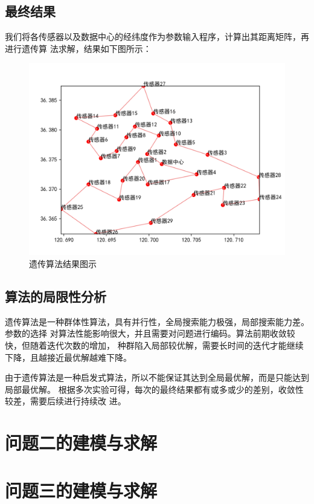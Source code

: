 \documentclass{ctexart}
\begin{document}
    \subsection{最终结果}
    我们将各传感器以及数据中心的经纬度作为参数输入程序，计算出其距离矩阵，再进行遗传算
    法求解，结果如下图所示：
    \begin{figure}[H]
        \centering
        \includegraphics[width=1\textwidth]{figure/path.png}
        \caption {遗传算法结果图示}
    \end{figure}

    \subsection{算法的局限性分析}
    遗传算法是一种群体性算法，具有并行性，全局搜索能力极强，局部搜索能力差。参数的选择
    对算法性能影响很大，并且需要对问题进行编码。算法前期收敛较快，但随着迭代次数的增加，
    种群陷入局部较优解，需要长时间的迭代才能继续下降，且越接近最优解越难下降。

    由于遗传算法是一种启发式算法，所以不能保证其达到全局最优解，而是只能达到局部最优解。
    根据多次实验可得，每次的最终结果都有或多或少的差别，收敛性较差，需要后续进行持续改
    进。

    \section{问题二的建模与求解}
    \section{问题三的建模与求解}
\end{document}
